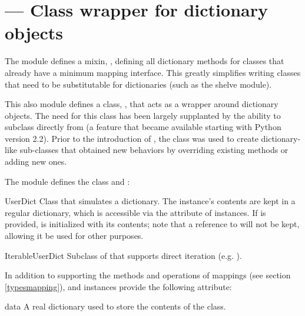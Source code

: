 \section{ ---
         Class wrapper for dictionary objects}



The module defines a mixin,  , defining all dictionary
methods for classes that already have a minimum mapping interface.  This
greatly simplifies writing classes that need to be substitutable for
dictionaries (such as the shelve module).

This also module defines a class, , that acts as a wrapper
around dictionary objects.  The need for this class has been largely
supplanted by the ability to subclass directly from  (a feature
that became available starting with Python version 2.2).  Prior to the
introduction of , the  class was used to
create dictionary-like sub-classes that obtained new behaviors by overriding
existing methods or adding new ones.

The  module defines the  class
and :

\begin{classdesc}{UserDict}{} 
Class that simulates a dictionary.  The instance's contents are kept
in a regular dictionary, which is accessible via the 
attribute of  instances.  If  is
provided,  is initialized with its contents; note that a
reference to  will not be kept, allowing it be used
for other purposes. 
\end{classdesc}

\begin{classdesc}{IterableUserDict}{}
Subclass of  that supports direct iteration (e.g. 
).
\end{classdesc}

In addition to supporting the methods and operations of mappings (see
section \ref{typesmapping}),  and
 instances provide the following attribute:

\begin{memberdesc}{data}
A real dictionary used to store the contents of the 
class.
\end{memberdesc}

